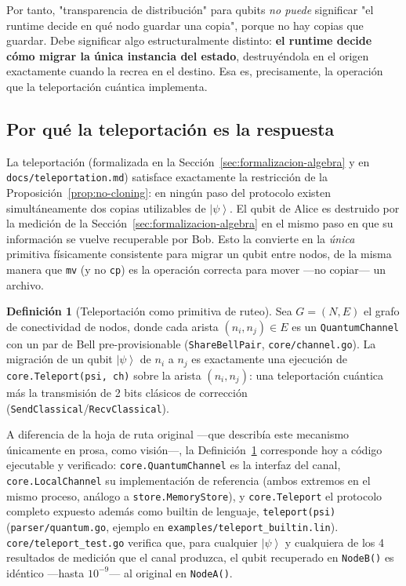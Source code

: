 \documentclass[12pt, a4paper, openany]{report}
\theoremstyle{definition}
\newtheorem{definition}{Definición}[chapter]
\newcommand{\ket}[1]{\left|#1\right\rangle}
\begin{document}
Por tanto, "transparencia de distribución" para qubits \emph{no puede} significar "el runtime decide en qué nodo guardar una copia", porque no hay copias que guardar. Debe significar algo estructuralmente distinto: \textbf{el runtime decide cómo migrar la única instancia del estado}, destruyéndola en el origen exactamente cuando la recrea en el destino. Esa es, precisamente, la operación que la teleportación cuántica implementa.

\subsection{Por qué la teleportación es la respuesta}

La teleportación (formalizada en la Sección~\ref{sec:formalizacion-algebra} y en \texttt{docs/teleportation.md}) satisface exactamente la restricción de la Proposición~\ref{prop:no-cloning}: en ningún paso del protocolo existen simultáneamente dos copias utilizables de $\ket{\psi}$. El qubit de Alice es destruido por la medición de la Sección~\ref{sec:formalizacion-algebra} en el mismo paso en que su información se vuelve recuperable por Bob. Esto la convierte en la \emph{única} primitiva físicamente consistente para migrar un qubit entre nodos, de la misma manera que \texttt{mv} (y no \texttt{cp}) es la operación correcta para mover —no copiar— un archivo.

\begin{definition}[Teleportación como primitiva de ruteo]
\label{def:teleportacion-ruteo}
Sea $G=(N,E)$ el grafo de conectividad de nodos, donde cada arista $(n_i,n_j)\in E$ es un \texttt{QuantumChannel} con un par de Bell pre-provisionable (\texttt{ShareBellPair}, \texttt{core/channel.go}). La migración de un qubit $\ket{\psi}$ de $n_i$ a $n_j$ es exactamente una ejecución de \texttt{core.Teleport(psi, ch)} sobre la arista $(n_i,n_j)$: una teleportación cuántica más la transmisión de 2 bits clásicos de corrección (\texttt{SendClassical}/\texttt{RecvClassical}).
\end{definition}

A diferencia de la hoja de ruta original —que describía este mecanismo únicamente en prosa, como visión—, la Definición~\ref{def:teleportacion-ruteo} corresponde hoy a código ejecutable y verificado: \texttt{core.QuantumChannel} es la interfaz del canal, \texttt{core.LocalChannel} su implementación de referencia (ambos extremos en el mismo proceso, análogo a \texttt{store.MemoryStore}), y \texttt{core.Teleport} el protocolo completo expuesto además como builtin de lenguaje, \texttt{teleport(psi)} (\texttt{parser/quantum.go}, ejemplo en \texttt{examples/teleport\_builtin.lin}). \texttt{core/teleport\_test.go} verifica que, para cualquier $\ket{\psi}$ y cualquiera de los 4 resultados de medición que el canal produzca, el qubit recuperado en \texttt{NodeB()} es idéntico —hasta $10^{-9}$— al original en \texttt{NodeA()}.
\end{document}
